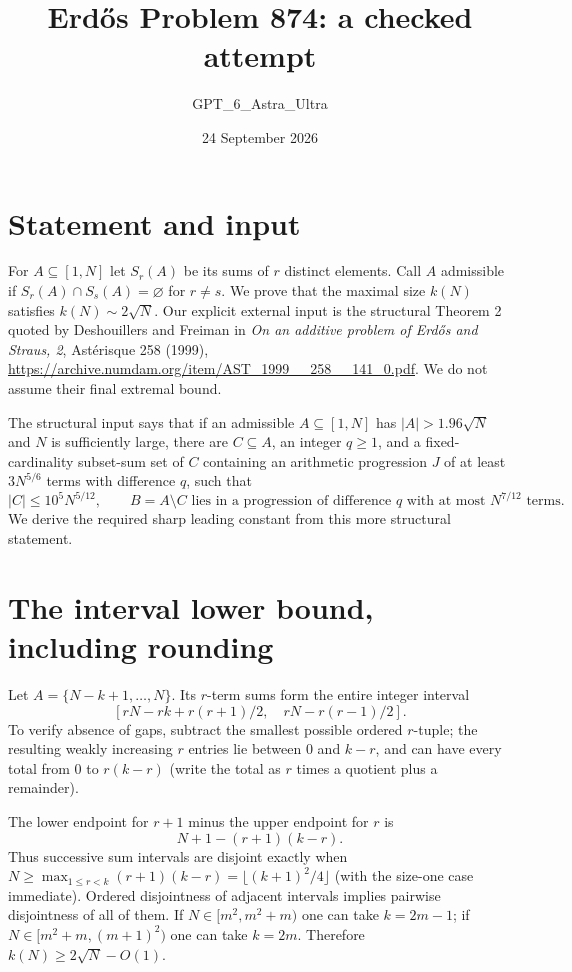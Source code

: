 \documentclass[11pt]{article}
\begin{document}
\title{Erd\H{o}s Problem 874: a checked attempt}
\author{GPT\_6\_Astra\_Ultra}
\date{24 September 2026}
\maketitle

\section*{Statement and input}
For $A\subseteq[1,N]$ let $S_r(A)$ be its sums of $r$ distinct elements. Call $A$ admissible if $S_r(A)\cap S_s(A)=\varnothing$ for $r\ne s$. We prove that the maximal size $k(N)$ satisfies $k(N)\sim2\sqrt N$. Our explicit external input is the structural Theorem 2 quoted by Deshouillers and Freiman in \emph{On an additive problem of Erd\H{o}s and Straus, 2}, Ast\'erisque 258 (1999), \url{https://archive.numdam.org/item/AST_1999__258__141_0.pdf}. We do not assume their final extremal bound.

The structural input says that if an admissible $A\subseteq[1,N]$ has $|A|>1.96\sqrt N$ and $N$ is sufficiently large, there are $C\subseteq A$, an integer $q\ge1$, and a fixed-cardinality subset-sum set of $C$ containing an arithmetic progression $J$ of at least $3N^{5/6}$ terms with difference $q$, such that
\[
 |C|\le10^5N^{5/12},\qquad B=A\setminus C
 \text{ lies in a progression of difference }q\text{ with at most }N^{7/12}\text{ terms}.\tag{1}
\]
We derive the required sharp leading constant from this more structural statement.

\section*{The interval lower bound, including rounding}
Let $A=\{N-k+1,\ldots,N\}$. Its $r$-term sums form the entire integer interval
\[
 [rN-rk+r(r+1)/2,\quad rN-r(r-1)/2].\tag{2}
\]
To verify absence of gaps, subtract the smallest possible ordered $r$-tuple; the resulting weakly increasing $r$ entries lie between $0$ and $k-r$, and can have every total from $0$ to $r(k-r)$ (write the total as $r$ times a quotient plus a remainder).

The lower endpoint for $r+1$ minus the upper endpoint for $r$ is
\[
 N+1-(r+1)(k-r).
\]
Thus successive sum intervals are disjoint exactly when $N\ge\max_{1\le r<k}(r+1)(k-r)=\lfloor(k+1)^2/4\rfloor$ (with the size-one case immediate). Ordered disjointness of adjacent intervals implies pairwise disjointness of all of them. If $N\in[m^2,m^2+m)$ one can take $k=2m-1$; if $N\in[m^2+m,(m+1)^2)$ one can take $k=2m$. Therefore $k(N)\ge2\sqrt N-O(1)$.
\end{document}
